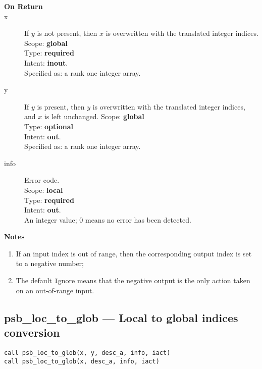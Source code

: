 \begin{description}
\item[\bf On Return]
\item[x] If $y$ is not present,
  then $x$ is overwritten with the translated integer indices. 
Scope: {\bf global} \\
Type: {\bf required}\\
Intent: {\bf inout}.\\
Specified as: a rank one integer array.
\item[y] If $y$ is  present,
  then $y$ is overwritten with the translated integer indices, and $x$
  is left unchanged. 
Scope: {\bf global} \\
Type: {\bf optional}\\
Intent: {\bf out}.\\
Specified as: a rank one integer array.
\item[info] Error code.\\
Scope: {\bf local} \\
Type: {\bf required} \\
Intent: {\bf out}.\\
An integer value; 0 means no error has been detected. 
\end{description}

{\par\noindent\large\bfseries Notes}
\begin{enumerate}
\item If an input index is out of range, then the corresponding output
  index is set to a negative number;
\item The default \verb|I|gnore means that the negative output is the
  only action taken on an out-of-range input.
\end{enumerate}


\clearpage\subsection*{psb\_loc\_to\_glob --- Local to global indices
  conversion}

\begin{verbatim}
call psb_loc_to_glob(x, y, desc_a, info, iact)
call psb_loc_to_glob(x, desc_a, info, iact)
\end{verbatim}

